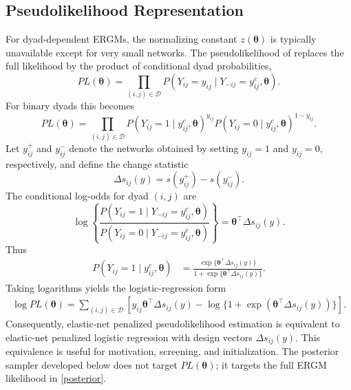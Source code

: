 \documentclass[preprint,12pt,authoryear]{elsarticle}
\def\th{\boldsymbol{\theta}}
\begin{document}
\subsection{Pseudolikelihood Representation}
For dyad-dependent ERGMs, the normalizing constant \(z(\th)\) is typically unavailable except for very small networks. The pseudolikelihood of \citet{strauss1990pseudolikelihood} replaces the full likelihood by the product of conditional dyad probabilities,
\begin{equation}
    PL(\th)= \prod_{(i,j)\in\mathcal D} P(Y_{ij}=y_{ij}\mid Y_{-ij}=y_{ij}^{c}, \th).
\end{equation}
For binary dyads this becomes
\begin{equation}
   PL(\th)= \prod_{(i,j)\in\mathcal D}
   P(Y_{ij}=1\mid y_{ij}^{c}, \th)^{y_{ij}}
   P(Y_{ij}=0\mid y_{ij}^{c}, \th)^{1-y_{ij}} .
\end{equation}
Let \(y_{ij}^{+}\) and \(y_{ij}^{-}\) denote the networks obtained by setting \(y_{ij}=1\) and \(y_{ij}=0\), respectively, and define the change statistic
\[
\Delta s_{ij}(y)=s(y_{ij}^{+})-s(y_{ij}^{-}).
\]
The conditional log-odds for dyad \((i,j)\) are
\begin{equation}\label{conditional log-odds}
    \log\left\{
    \frac{P(Y_{ij}=1\mid Y_{-ij}=y_{ij}^{c},\th)}
    {P(Y_{ij}=0\mid Y_{-ij}=y_{ij}^{c},\th)}
    \right\}
    =
    \th^\top\Delta s_{ij}(y).
\end{equation}
Thus
\begin{align}\label{logit}
P(Y_{ij}=1\mid y_{ij}^{c},\th)
&=
\frac{\exp\{\th^\top\Delta s_{ij}(y)\}}
{1+\exp\{\th^\top\Delta s_{ij}(y)\}}.
\end{align}
Taking logarithms yields the logistic-regression form
\begin{align}\label{likelihood of pseudolikelihood}
    \log PL(\th)
    =
    \sum_{(i,j)\in\mathcal D}
    \left[
    y_{ij}\th^\top\Delta s_{ij}(y)
    -
    \log\{1+\exp(\th^\top\Delta s_{ij}(y))\}
    \right].
\end{align}
Consequently, elastic-net penalized pseudolikelihood estimation is equivalent to elastic-net penalized logistic regression with design vectors \(\Delta s_{ij}(y)\). This equivalence is useful for motivation, screening, and initialization. The posterior sampler developed below does not target \(PL(\th)\); it targets the full ERGM likelihood in \eqref{posterior}.
\end{document}
